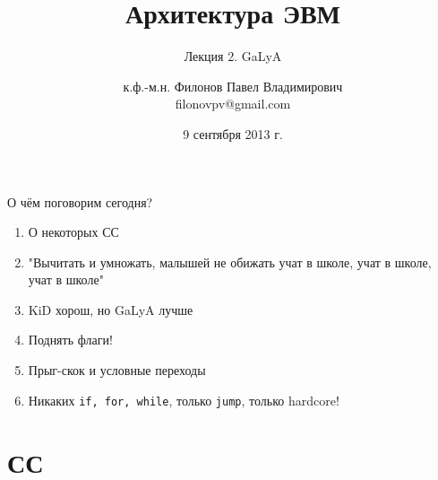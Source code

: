 \documentclass{beamer}
\title{Архитектура ЭВМ}
\subtitle{Лекция 2. GaLyA}
\author{к.ф.-м.н. Филонов Павел Владимирович \\ filonovpv@gmail.com}
\date{9 сентября 2013 г.}
\institute[МГТУ ГА] 
{
    Московский Государственный Технический Университет \\
    Гражданской Авиации
}
\begin{document}
    \frame{\titlepage}
    \begin{frame}{О чём поговорим сегодня?}
        \begin{enumerate}
            \pause
            \item О некоторых СС 
            \pause
            \item "Вычитать и умножать, малышей не обижать учат в школе, учат в школе, учат в школе"
            \pause
            \item KiD хорош, но GaLyA лучше
            \pause
            \item Поднять флаги!
            \pause
            \item Прыг-скок и условные переходы
            \pause
            \item Никаких {\tt if, for, while}, только {\tt jump}, только hardcore!
        \end{enumerate}
    \end{frame}

    \section{СС}
\end{document}
